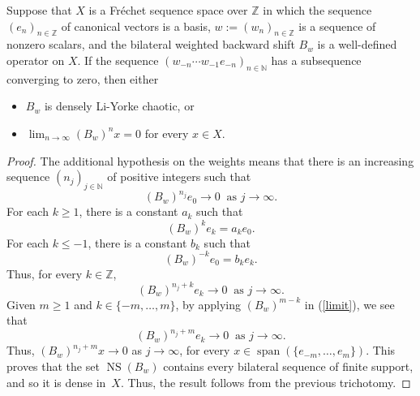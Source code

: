 \documentclass[10pt,a4paper]{amsart}
\newcommand{\N}{\mathbb{N}}
\newcommand{\NS}{\operatorname{NS}}
\newcommand{\Z}{\mathbb{Z}}
\newcommand{\spa}{\operatorname{span}}
\begin{document}
\begin{corollary}\label{BWBS}
Suppose that $X$ is a Fr\'echet sequence space over $\Z$ in which the sequence $(e_n)_{n \in \Z}$ of canonical vectors is a basis,
$w\!:= (w_n)_{n \in \Z}$ is a sequence of nonzero scalars, and the bilateral weighted backward shift $B_w$ is a well-defined 
operator on $X$. If the sequence $(w_{-n} \cdots w_{-1} e_{-n})_{n \in \N}$ has a subsequence converging to zero, then either
\begin{itemize}
\item [\rm (a)] $B_w$ is densely Li-Yorke chaotic, or
\item [\rm (b)] $\displaystyle \lim_{n \to \infty} (B_w)^n x = 0$ for every $x \in X$.
\end{itemize}
\end{corollary}

\begin{proof}
The additional hypothesis on the weights means that there is an increasing sequence $(n_j)_{j \in \N}$ of positive integers such that
\[
(B_w)^{n_j}e_0 \to 0 \ \text{ as } j \to \infty.
\]
For each $k \geq 1$, there is a constant $a_k$ such that
\[
(B_w)^k e_k = a_k e_0.
\]
For each $k \leq -1$, there is a constant $b_k$ such that
\[
(B_w)^{-k} e_0 = b_k e_k.
\]
Thus, for every $k \in \Z$,
\begin{equation}
(B_w)^{n_j + k} e_k \to 0 \ \text{ as } j \to \infty.\label{limit}
\end{equation}
Given $m \geq 1$ and $k \in \{-m,\ldots,m\}$, by applying $(B_w)^{m-k}$ in (\ref{limit}), we see that
\[
(B_w)^{n_j + m} e_k \to 0 \ \text{ as } j \to \infty.
\]
Thus, $(B_w)^{n_j + m} x \to 0$ as $j \to \infty$, for every $x \in \spa(\{e_{-m},\ldots,e_m\})$. 
This proves that the set $\NS(B_w)$ contains every bilateral sequence of finite support, and so it is dense in~$X$.
Thus, the result follows from the previous trichotomy.
\end{proof}
\end{document}
